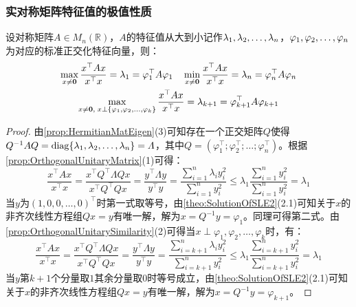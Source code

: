 \subsubsection{实对称矩阵特征值的极值性质}
\begin{theorem}\label{theo:maxminxAx/xx}
	设对称矩阵$A\in M_{n}(\mathbb{R})$，$A$的特征值从大到小记作$\lambda_1, \lambda_2, \dots, \lambda_{n}$，$\varphi_1, \varphi_2, \dots, \varphi_{n}$为对应的标准正交化特征向量，则：
	\begin{gather*}
		\max_{x\ne\mathbf{0}}\frac{x^{\top}Ax}{x^{\top}x}=\lambda_1=\varphi_1^{\top}A\varphi_1\quad
		\min_{x\ne\mathbf{0}}\frac{x^{\top}Ax}{x^{\top}x}=\lambda_n=\varphi_n^{\top}A\varphi_n \\
		\max_{x\ne\mathbf{0},\;x\perp\{\varphi_1, \varphi_2, \dots, \varphi_{k}\}}\frac{x^{\top}Ax}{x^{\top}x}=\lambda_{k+1}=\varphi_{k+1}^{\top}A\varphi_{k+1}
	\end{gather*}
\end{theorem} 
\begin{proof}
	由\cref{prop:HermitianMatEigen}(3)可知存在一个正交矩阵$Q$使得$Q^{-1}AQ=\operatorname{diag}\{\lambda_1, \lambda_2, \dots, \lambda_{n}\}=\varLambda$，其中$Q=(\varphi_1^{\top};\varphi_2^{\top};\dots;\varphi_n^{\top})$。根据\cref{prop:OrthogonalUnitaryMatrix}(1)可得：
	\begin{equation*}
		\frac{x^{\top}Ax}{x^{\top}x}=\frac{x^{\top}Q^{\top}\varLambda Qx}{x^{\top}Q^{\top}Qx}=\frac{y^{\top}\varLambda y}{y^{\top}y}=\frac{\sum\limits_{i=1}^{n}\lambda_iy_i^2}{\sum\limits_{i=1}^ny_i^2}\leqslant\lambda_1\frac{\sum\limits_{i=1}^{n}y_i^2}{\sum\limits_{i=1}^ny_i^2}=\lambda_1
	\end{equation*}
	当$y$为$(1,0,0,\dots,0)^{\top}$时第一式取等号，由\cref{theo:SolutionOfSLE2}(2.1)可知关于$x$的非齐次线性方程组$Qx=y$有唯一解，解为$x=Q^{-1}y=\varphi_1$。同理可得第二式。由\cref{prop:OrthogonalUnitarySimilarity}(2)可得当$x\perp\varphi_1,\varphi_2,\dots,\varphi_k$时，有：
	\begin{equation*}
		\frac{x^{\top}Ax}{x^{\top}x}=\frac{x^{\top}Q^{\top}\varLambda Qx}{x^{\top}Q^{\top}Qx}=\frac{y^{\top}\varLambda y}{y^{\top}y}=\frac{\sum\limits_{i=k+1}^{n}\lambda_iy_i^2}{\sum\limits_{i=k+1}^ny_i^2}\leqslant\lambda_1\frac{\sum\limits_{i=k+1}^{n}y_i^2}{\sum\limits_{i=k+1}^ny_i^2}=\lambda_1
	\end{equation*}
	当$y$第$k+1$个分量取$1$其余分量取$0$时等号成立，由\cref{theo:SolutionOfSLE2}(2.1)可知关于$x$的非齐次线性方程组$Qx=y$有唯一解，解为$x=Q^{-1}y=\varphi_{k+1}$。
\end{proof}
